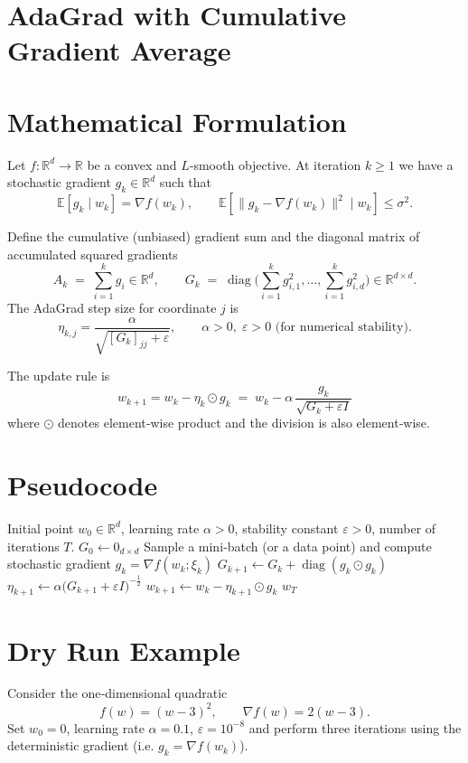 \documentclass{article}
\newcommand{\E}{\mathbb{E}}
\newcommand{\R}{\mathbb{R}}
\begin{document}
\section*{AdaGrad with Cumulative Gradient Average}

\section*{Mathematical Formulation}
Let $f:\R^{d}\rightarrow\R$ be a convex and $L$‑smooth objective.  
At iteration $k\ge 1$ we have a stochastic gradient $g_k\in\R^{d}$ such that  
\[
\E\!\left[g_k\mid w_k\right]=\nabla f(w_k),\qquad 
\E\!\left[\|g_k-\nabla f(w_k)\|^2\mid w_k\right]\le\sigma^2 .
\]

Define the cumulative (unbiased) gradient sum and the diagonal matrix of accumulated squared
gradients
\[
A_k \;=\; \sum_{i=1}^{k} g_i \in \R^{d},\qquad 
G_k \;=\;\operatorname{diag}\!\Big(\sum_{i=1}^{k} g_{i,1}^{2},\dots,
\sum_{i=1}^{k} g_{i,d}^{2}\Big)\in\R^{d\times d}.
\]
The AdaGrad step size for coordinate $j$ is
\[
\eta_{k,j}= \frac{\alpha}{\sqrt{[G_k]_{jj}+\varepsilon}},\qquad
\alpha>0,\;\varepsilon>0\text{ (for numerical stability).}
\]

The update rule is
\[
\boxed{ \; w_{k+1}= w_k - \eta_k\odot g_k
      \;=\; w_k - \alpha\,\frac{g_k}{\sqrt{G_k+\varepsilon I}} \;}
\tag{1}
\]
where $\odot$ denotes element‑wise product and the division is also element‑wise.

\section*{Pseudocode}
\begin{algorithm}[H]
\caption{AdaGrad (vector form)}\label{alg:adagrad}
\begin{algorithmic}[1]
\REQUIRE Initial point $w_0\in\R^{d}$, learning rate $\alpha>0$, 
         stability constant $\varepsilon>0$, number of iterations $T$.
\STATE $G_0 \gets 0_{d\times d}$ 
    \STATE Sample a mini‑batch (or a data point) and compute stochastic gradient 
           $g_k = \nabla f(w_k; \xi_k)$
    \STATE $G_{k+1} \gets G_k + \operatorname{diag}(g_k\odot g_k)$
    \STATE $\eta_{k+1} \gets \alpha\big(G_{k+1}+\varepsilon I\big)^{-\frac12}$
    \STATE $w_{k+1} \gets w_k - \eta_{k+1}\odot g_k$
\ENDFOR
\RETURN $w_T$
\end{algorithmic}
\end{algorithm}

\section*{Dry Run Example}
Consider the one‑dimensional quadratic
\[
f(w) = (w-3)^2,\qquad \nabla f(w)=2(w-3).
\]
Set $w_0=0$, learning rate $\alpha=0.1$, $\varepsilon=10^{-8}$ and perform three
iterations using the deterministic gradient (i.e. $g_k=\nabla f(w_k)$).
\end{document}
